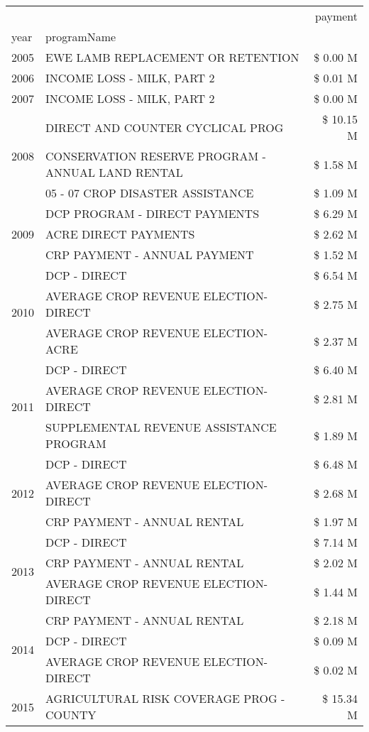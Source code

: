 \begin{tabular}{llr}
\toprule
 &  & payment \\
year & programName &  \\
\midrule
2005 & EWE LAMB REPLACEMENT OR RETENTION & \$ 0.00 M \\
\cline{1-3}
2006 & INCOME LOSS - MILK, PART 2 & \$ 0.01 M \\
\cline{1-3}
2007 & INCOME LOSS - MILK, PART 2 & \$ 0.00 M \\
\cline{1-3}
\multirow[t]{3}{*}{2008} & DIRECT AND COUNTER CYCLICAL PROG & \$ 10.15 M \\
 & CONSERVATION RESERVE PROGRAM - ANNUAL LAND RENTAL & \$ 1.58 M \\
 & 05 - 07 CROP DISASTER ASSISTANCE & \$ 1.09 M \\
\cline{1-3}
\multirow[t]{3}{*}{2009} & DCP PROGRAM - DIRECT PAYMENTS & \$ 6.29 M \\
 & ACRE DIRECT PAYMENTS & \$ 2.62 M \\
 & CRP PAYMENT - ANNUAL PAYMENT & \$ 1.52 M \\
\cline{1-3}
\multirow[t]{3}{*}{2010} & DCP - DIRECT & \$ 6.54 M \\
 & AVERAGE CROP REVENUE ELECTION-DIRECT & \$ 2.75 M \\
 & AVERAGE CROP REVENUE ELECTION-ACRE & \$ 2.37 M \\
\cline{1-3}
\multirow[t]{3}{*}{2011} & DCP - DIRECT & \$ 6.40 M \\
 & AVERAGE CROP REVENUE ELECTION-DIRECT & \$ 2.81 M \\
 & SUPPLEMENTAL REVENUE ASSISTANCE PROGRAM & \$ 1.89 M \\
\cline{1-3}
\multirow[t]{3}{*}{2012} & DCP - DIRECT & \$ 6.48 M \\
 & AVERAGE CROP REVENUE ELECTION-DIRECT & \$ 2.68 M \\
 & CRP PAYMENT - ANNUAL RENTAL & \$ 1.97 M \\
\cline{1-3}
\multirow[t]{3}{*}{2013} & DCP - DIRECT & \$ 7.14 M \\
 & CRP PAYMENT - ANNUAL RENTAL & \$ 2.02 M \\
 & AVERAGE CROP REVENUE ELECTION-DIRECT & \$ 1.44 M \\
\cline{1-3}
\multirow[t]{3}{*}{2014} & CRP PAYMENT - ANNUAL RENTAL & \$ 2.18 M \\
 & DCP - DIRECT & \$ 0.09 M \\
 & AVERAGE CROP REVENUE ELECTION-DIRECT & \$ 0.02 M \\
\cline{1-3}
\multirow[t]{3}{*}{2015} & AGRICULTURAL RISK COVERAGE PROG - COUNTY & \$ 15.34 M \\

\end{tabular}
